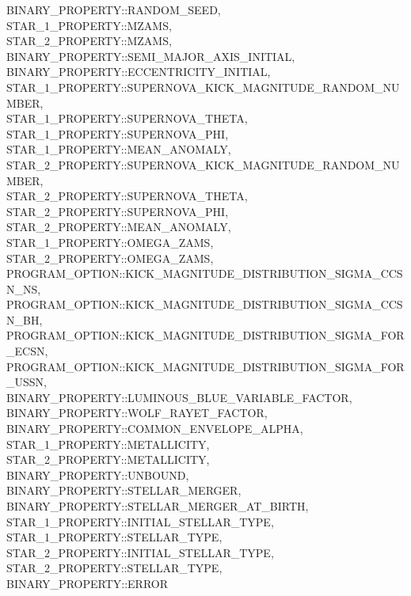 \hfill
\begin{minipage}{\dimexpr\textwidth-2em}
    BINARY\_PROPERTY::RANDOM\_SEED, \\
    STAR\_1\_PROPERTY::MZAMS, \\
    STAR\_2\_PROPERTY::MZAMS, \\
    BINARY\_PROPERTY::SEMI\_MAJOR\_AXIS\_INITIAL, \\
    BINARY\_PROPERTY::ECCENTRICITY\_INITIAL, \\
    STAR\_1\_PROPERTY::SUPERNOVA\_KICK\_MAGNITUDE\_RANDOM\_NUMBER, \\
    STAR\_1\_PROPERTY::SUPERNOVA\_THETA, \\
    STAR\_1\_PROPERTY::SUPERNOVA\_PHI, \\
    STAR\_1\_PROPERTY::MEAN\_ANOMALY, \\
    STAR\_2\_PROPERTY::SUPERNOVA\_KICK\_MAGNITUDE\_RANDOM\_NUMBER, \\
    STAR\_2\_PROPERTY::SUPERNOVA\_THETA, \\
    STAR\_2\_PROPERTY::SUPERNOVA\_PHI, \\
    STAR\_2\_PROPERTY::MEAN\_ANOMALY, \\
    STAR\_1\_PROPERTY::OMEGA\_ZAMS, \\
    STAR\_2\_PROPERTY::OMEGA\_ZAMS, \\
    PROGRAM\_OPTION::KICK\_MAGNITUDE\_DISTRIBUTION\_SIGMA\_CCSN\_NS, \\
    PROGRAM\_OPTION::KICK\_MAGNITUDE\_DISTRIBUTION\_SIGMA\_CCSN\_BH, \\
    PROGRAM\_OPTION::KICK\_MAGNITUDE\_DISTRIBUTION\_SIGMA\_FOR\_ECSN, \\
    PROGRAM\_OPTION::KICK\_MAGNITUDE\_DISTRIBUTION\_SIGMA\_FOR\_USSN, \\
    BINARY\_PROPERTY::LUMINOUS\_BLUE\_VARIABLE\_FACTOR, \\
    BINARY\_PROPERTY::WOLF\_RAYET\_FACTOR, \\
    BINARY\_PROPERTY::COMMON\_ENVELOPE\_ALPHA, \\
    STAR\_1\_PROPERTY::METALLICITY, \\
    STAR\_2\_PROPERTY::METALLICITY, \\
    BINARY\_PROPERTY::UNBOUND, \\
    BINARY\_PROPERTY::STELLAR\_MERGER, \\
    BINARY\_PROPERTY::STELLAR\_MERGER\_AT\_BIRTH, \\
    STAR\_1\_PROPERTY::INITIAL\_STELLAR\_TYPE, \\
    STAR\_1\_PROPERTY::STELLAR\_TYPE, \\
    STAR\_2\_PROPERTY::INITIAL\_STELLAR\_TYPE, \\
    STAR\_2\_PROPERTY::STELLAR\_TYPE, \\
    BINARY\_PROPERTY::ERROR
\end{minipage}
\par\rcb{;}

